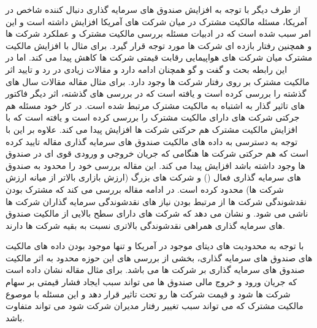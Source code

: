 \documentclass[12pt, a4paper]{article}
\begin{document}
از طرف دیگر  با توجه به افزایش صندوق های سرمایه گذاری  دنبال کننده شاخص در آمریکا، مسئله مالکیت مشترک در میان شرکت های آمریکا افزایش داشته است و این امر سبب شده است که در ادبیات مسئله بررسی مالکیت مشترک و عملکرد شرکت ها و همچنین رفتار بازده ای شرکت ها مورد توجه قرار گیرد. 
برای مثال 
با افزایش مالکیت مشترک میان شرکت های هواپیمایی رقابت قیمتی شرکت ها کاهش پیدا می کند.  اما در این رابطه بحث و گفت و گو همچنان ادامه دارد و مقالات زیادی در رد و تایید اثر مالکیت مشترک بر روی رفتار شرکت ها وجود دارد. برای مثال مقاله
مقالات سال های گذشته را بررسی کرده است و یافته است که در بررسی های گذشته، اثر دیگر فاکتور های تاثیر گذار به اشتباه به مالکیت مشترک مرتبط شده است.
در کار خود مسئله هم جرکتی شرکت های دارای مالکیت مشترک را بررسی کرده است و یافته است که با افزایش مالکیت مشترک هم حرکتی شرکت ها افزایش پیدا می کند. علاوه بر این با توجه به دسترسی به داده های مالکیت صندوق های سرمایه گذاری مقاله تایید کرده است که هم حرکتی شرکت ها هنگامی که جریان خروجی و ورودی قوی ای در صندوق ها وجود داشته باشد افزایش پیدا می کند. این مقاله بررسی خود را محدود به صندوق های سرمایه گذاری فعال 
() 
و شرکت های بزرگ (ارزش بازاری بالاتر از میانه ارزش شرکت ها) محدود کرده است.
در ادامه مقاله 
بررسی می کند که مشترک بودن نقدشوندگی شرکت ها از مرتبط بودن نیاز های نقدشوندگی سرمایه گذاران شرکت ها ناشی می شود. و نشان می دهد که شرکت های دارای سطح بالایی از مالکیت صندوق های سرمایه گذاری همراهی نقدشوندگی بالاتری نسبت به بقیه شرکت ها دارند.

با توجه به محدودیت های دیتای موجود در آمریکا و  تنها موجود بودن داده های مالکیت های صندوق های سرمایه گذاری، بخشی از بررسی های این حوزه محدود به اثر مالکیت صندوق های سرمایه گذاری بر شرکت ها می باشد. برای مثال مقاله 
نشان داده است که جریان ورود و خروج مالی صندوق ها می تواند سبب ایجاد فشار قیمتی بر سهام شرکت ها شود و قیمت شرکت ها رو تحت تاثیر قرار دهد و این مسئله با موصوع مالکیت مشترک که می تواند سبب تغییر رفتار مدیران شرکت شود می تواند متفاوت باشد.
\end{document}
